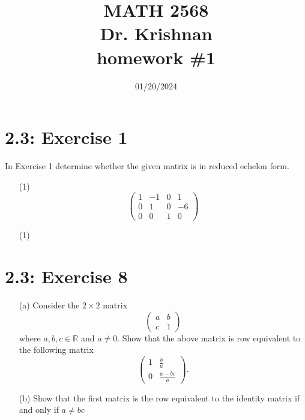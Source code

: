 \documentclass{report}
\title{\Huge{MATH 2568}\\\huge{Dr. Krishnan}\\homework \#1}
\author{\Huge{\mylink{https://www.sohumsuthar.com}{Sohum Suthar}}}
\date{\huge {01/20/2024}}
\begin{document}
\maketitle
\newpage
{}	
\tableofcontents
\pagebreak





\section*{2.3: Exercise 1} 

In Exercise 1 determine
whether the given matrix is in reduced echelon form.

\begin{enumerate}
    \item[(1)] 
    \[
    \left(\begin{array}{rrrr} 1 & -1 & 0 & 1 \\0 &  1 &  0 &  -6\\ 0 & 0 & 1 & 0 \end{array}\right)
\]
    
\end{enumerate}

\sol 

\begin{enumerate}
\item[(1)]     




\end{enumerate}







\section*{2.3: Exercise 8} 

\begin{enumerate}
    \item[(a)] Consider the $2\times 2$ matrix
    \[ 
    \left(\begin{array}{rrrr} a & b \\ c & 1 \end{array}\right)
    \]
    where $a,b,c\in\mathbb{R}$ and $a\neq 0$.  Show that the above matrix is row equivalent to the following matrix
\[
\left(\begin{array}{cc} 1 & \frac{b}{a} \\ 0 & \frac{a-bc}{a}
\end{array} \right).
\]

    
    \item[(b)] Show that the first matrix is the row equivalent to the
identity matrix if and only if $a\neq bc$

\end{enumerate}
\end{document}
